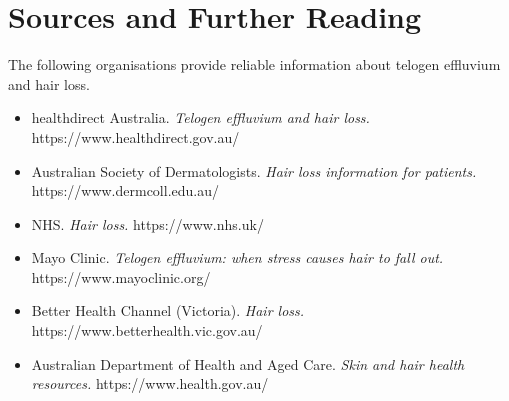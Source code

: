 \section*{Sources and Further Reading}
The following organisations provide reliable information about telogen effluvium and hair loss.

\begin{itemize}
    \item healthdirect Australia. \textit{Telogen effluvium and hair loss.} https://www.healthdirect.gov.au/
    \item Australian Society of Dermatologists. \textit{Hair loss information for patients.} https://www.dermcoll.edu.au/
    \item NHS. \textit{Hair loss.} https://www.nhs.uk/
    \item Mayo Clinic. \textit{Telogen effluvium: when stress causes hair to fall out.} https://www.mayoclinic.org/
    \item Better Health Channel (Victoria). \textit{Hair loss.} https://www.betterhealth.vic.gov.au/
    \item Australian Department of Health and Aged Care. \textit{Skin and hair health resources.} https://www.health.gov.au/
\end{itemize}

\clearpage
